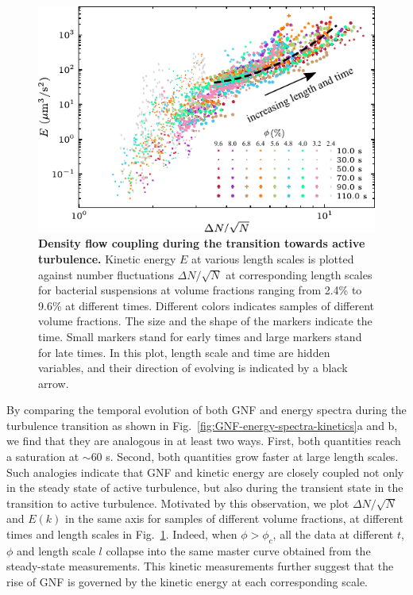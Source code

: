 \begin{figure}[h]
\begin{center}
\includegraphics[width=5.5in]{figs/5-GNF/9.pdf}
\caption[Density flow coupling during the transition towards active turbulence]
{
\textbf{Density flow coupling during the transition towards active turbulence.}
Kinetic energy $E$ at various length scales is plotted against number fluctuations $\Delta N/\sqrt N$ at corresponding length scales for bacterial suspensions at volume fractions ranging from 2.4\% to 9.6\% at different times. Different colors indicates samples of different volume fractions. The size and the shape of the markers indicate the time. Small markers stand for early times and large markers stand for late times. In this plot, length scale and time are hidden variables, and their direction of evolving is indicated by a black arrow.
}
\label{fig:GNF-energy-spectra-correlation-transient}
\end{center}
\end{figure}

By comparing the temporal evolution of both GNF and energy spectra during the turbulence transition as shown in Fig.~\ref{fig:GNF-energy-spectra-kinetics}a and b, we find that they are analogous in at least two ways. First, both quantities reach a saturation at $\sim 60$ s. Second, both quantities grow faster at large length scales. Such analogies indicate that GNF and kinetic energy are  closely coupled not only in the steady state of active turbulence, but also during the transient state in the transition to active turbulence.
Motivated by this observation, we plot $\Delta N/\sqrt N$ and $E(k)$ in the same axis for samples of different volume fractions, at different times and length scales in Fig.~\ref{fig:GNF-energy-spectra-correlation-transient}. Indeed, when $\phi>\phi_c$, all the data at different $t$, $\phi$ and length scale $l$ collapse into the same master curve obtained from the steady-state measurements.
This kinetic measurements further suggest that the rise of GNF is governed by the kinetic energy at each corresponding scale.



